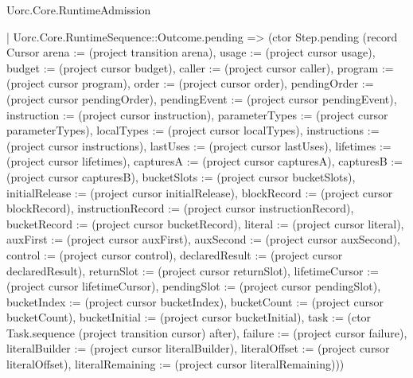 \begin{lexlean}{Uorc.Core.RuntimeAdmission}
\begin{semanticmodule}
{        | Uorc.Core.RuntimeSequence::Outcome.pending => (ctor Step.pending (record Cursor {arena := (project transition arena), usage := (project cursor usage), budget := (project cursor budget), caller := (project cursor caller), program := (project cursor program), order := (project cursor order), pendingOrder := (project cursor pendingOrder), pendingEvent := (project cursor pendingEvent), instruction := (project cursor instruction), parameterTypes := (project cursor parameterTypes), localTypes := (project cursor localTypes), instructions := (project cursor instructions), lastUses := (project cursor lastUses), lifetimes := (project cursor lifetimes), capturesA := (project cursor capturesA), capturesB := (project cursor capturesB), bucketSlots := (project cursor bucketSlots), initialRelease := (project cursor initialRelease), blockRecord := (project cursor blockRecord), instructionRecord := (project cursor instructionRecord), bucketRecord := (project cursor bucketRecord), literal := (project cursor literal), auxFirst := (project cursor auxFirst), auxSecond := (project cursor auxSecond), control := (project cursor control), declaredResult := (project cursor declaredResult), returnSlot := (project cursor returnSlot), lifetimeCursor := (project cursor lifetimeCursor), pendingSlot := (project cursor pendingSlot), bucketIndex := (project cursor bucketIndex), bucketCount := (project cursor bucketCount), bucketInitial := (project cursor bucketInitial), task := (ctor Task.sequence (project transition cursor) after), failure := (project cursor failure), literalBuilder := (project cursor literalBuilder), literalOffset := (project cursor literalOffset), literalRemaining := (project cursor literalRemaining)}))
}
\end{semanticmodule}
\end{lexlean}
